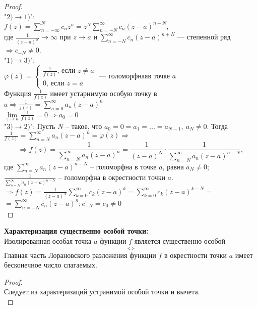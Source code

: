 \begin{proof}
    \ \\
    "$2) \to 1)$":\\
    $f(z)=\sum_{n=-\infty}^N c_n z^n=z^N\sum_{n=-N}^\infty c_n (z-a)^{n+N},$\\
    где $\frac{1}{(z-a)^N}\to \infty$ при $z\to a$ и $\sum_{n=-N}^\infty c_n (z-a)^{n+N}$ --- степенной ряд $\Rightarrow c_{-N} \neq 0$.\\[2mm]
    "$1) \to 3)$":\\
    $\varphi(z)=
    \begin{cases}
        \frac{1}{f(z)}\text{, если }z\neq a\\
        0\text{, если }z=a
    \end{cases}
    \text{ --- голоморфнаяв точке }a$\\
    Функция $\frac{1}{f(z)}$ имеет устарнимую особую точку в $a \Rightarrow \frac{1}{f(z)}=\sum_{n=0}^\infty a_n(z-a)^n$\\
    $\lim\limits_{z\to a}\frac{1}{f(z)}=0\Rightarrow a_0 =0$\\[2mm]
    "$3) \to 2)$":
    Пусть $N$ -- такое, что $a_0 = 0 = a_1=...=a_{N-1}, \ a_N \neq 0$.   Тогда $\frac{1}{f(z)}=\sum_{n=N}^\infty a_n(z-a)^n=\varphi(z) \Rightarrow $
    $$\Rightarrow f(z)=\frac{1}{\sum_{n=N}^\infty a_n(z-a)^n}=\frac{1}{(z-a)^N}\cdot \frac{1}{\sum_{n=N}^\infty a_n (z-a)^{n-N}},$$
    где $\sum_{n=N}^\infty a_n (z-a)^{n-N}$ -- голоморфна в точке $a$, равна $a_N \neq 0$;\\
    $\frac{1}{\sum_{n=N}^\infty a_n (z-a)^{n-N}}$ -- голоморфна в окрестности точки $a$.\\
    $\Rightarrow f(z)=\frac{1}{(z-a)^N}\sum_{k=0}^\infty c_k (z-a)^k = \sum_{k=0}^\infty c_k (z-a)^{k-N}=$\\
    $=\sum_{n=-N}^\infty \tilde{c_n}(z-a)^n; \tilde{c_{-N}}=c_0\neq 0$\\[2mm]
\end{proof}

\textbf{Характеризация существенно особой точки:}\\
Изолированная особая точка $a$ функции $f$ является существенно особой
$$\Leftrightarrow$$
Главная часть Лорановского разложения функции $f$ в окрестности точки $a$ имеет бесконечное число слагаемых.\\
\begin{proof}
    \ \\
    Следует из характеризаций устранимой особой точки и вычета.\\[2mm]
\end{proof}



